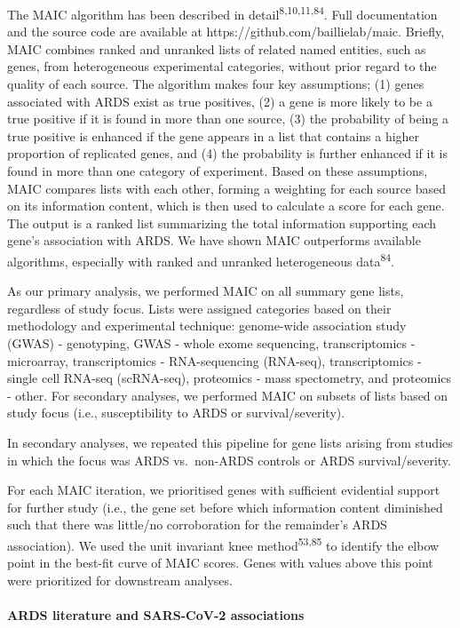 \documentclass[
  11,
  a4paper,
]{article}
\let\oldparagraph\paragraph
\renewcommand{\paragraph}[1]{\oldparagraph{#1}\mbox{}}
\begin{document}
The MAIC algorithm has been described in
detail\textsuperscript{8,10,11,84}. Full documentation and the source
code are available at https://github.com/baillielab/maic. Briefly, MAIC
combines ranked and unranked lists of related named entities, such as
genes, from heterogeneous experimental categories, without prior regard
to the quality of each source. The algorithm makes four key assumptions;
(1) genes associated with ARDS exist as true positives, (2) a gene is
more likely to be a true positive if it is found in more than one
source, (3) the probability of being a true positive is enhanced if the
gene appears in a list that contains a higher proportion of replicated
genes, and (4) the probability is further enhanced if it is found in
more than one category of experiment. Based on these assumptions, MAIC
compares lists with each other, forming a weighting for each source
based on its information content, which is then used to calculate a
score for each gene. The output is a ranked list summarizing the total
information supporting each gene's association with ARDS. We have shown
MAIC outperforms available algorithms, especially with ranked and
unranked heterogeneous data\textsuperscript{84}.

As our primary analysis, we performed MAIC on all summary gene lists,
regardless of study focus. Lists were assigned categories based on their
methodology and experimental technique: genome-wide association study
(GWAS) - genotyping, GWAS - whole exome sequencing, transcriptomics -
microarray, transcriptomics - RNA-sequencing (RNA-seq), transcriptomics
- single cell RNA-seq (scRNA-seq), proteomics - mass spectometry, and
proteomics - other. For secondary analyses, we performed MAIC on subsets
of lists based on study focus (i.e., susceptibility to ARDS or
survival/severity).

In secondary analyses, we repeated this pipeline for gene lists arising
from studies in which the focus was ARDS vs.~non-ARDS controls or ARDS
survival/severity.

For each MAIC iteration, we prioritised genes with sufficient evidential
support for further study (i.e., the gene set before which information
content diminished such that there was little/no corroboration for the
remainder's ARDS association). We used the unit invariant knee
method\textsuperscript{53,85} to identify the elbow point in the
best-fit curve of MAIC scores. Genes with values above this point were
prioritized for downstream analyses.

\paragraph{ARDS literature and SARS-CoV-2
associations}\label{ards-literature-and-sars-cov-2-associations}
\end{document}
